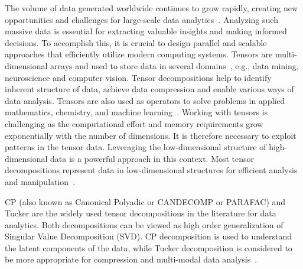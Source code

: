 \documentclass[a4paper,11pt, margin=2cm]{article}
\newcommand{\bora}[1]{{\color{magenta} \emph{#1}}}
\newcommand{\sk}[1]{{\color{blue} \emph{#1}}}
\begin{document}
	The volume of data generated worldwide continues to grow rapidly, creating new opportunities and challenges for large-scale data analytics~\cite{data-generation-2025}. Analyzing such massive data is essential for extracting valuable insights and making informed decisions.
%	
%	
	To accomplish this, it is crucial to design parallel and scalable approaches that efficiently utilize modern computing systems. Tensors are multi-dimensional arrays and used to store data in several domains~\cite{KB-SIAM-2009}, e.g., data mining, neuroscience and computer vision. Tensor decompositions help to identify inherent structure of data, achieve data compression and enable various ways of data analysis. Tensors are also used as operators to solve problems in applied mathematics, chemistry, and machine learning~\cite{KB-SIAM-2009,NPOV-NIPS-2015}.
	Working with tensors is challenging as the computational effort and memory requirements grow exponentially with the number of dimensions. It is therefore necessary to exploit patterns in the tensor data. Leveraging the low-dimensional structure of high-dimensional data is a powerful approach in this context. Most tensor decompositions represent data in low-dimensional structures for efficient analysis and manipulation~\cite{KB-SIAM-2009}.
	
	
	
	
	CP (also known as Canonical Polyadic or CANDECOMP or PARAFAC) and Tucker are the widely used tensor decompositions in the literature for data analytics. Both decompositions can be viewed as high order generalization of Singular Value Decomposition (SVD). CP decomposition is used to understand the latent components of the data, while Tucker decomposition is considered to be more appropriate for compression and multi-modal data analysis~\cite{KB-SIAM-2009}.
	
\end{document}
